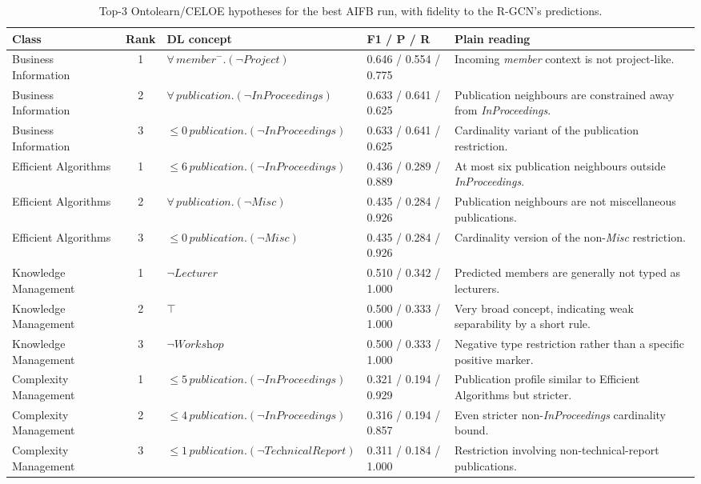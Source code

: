 \documentclass[runningheads]{llncs}
\begin{document}
\begin{table}[ht]
\centering
\scriptsize
\setlength{\tabcolsep}{3pt}
\caption{Top-3 Ontolearn/CELOE hypotheses for the best AIFB run, with fidelity to the R-GCN's predictions.}
\label{tab:explanations-full}
\begin{tabular}{@{}p{2.05cm}cp{3.05cm}p{1.55cm}p{3.4cm}@{}}
\toprule
\textbf{Class} & \textbf{Rank} & \textbf{DL concept} & \textbf{F1 / P / R} & \textbf{Plain reading} \\
\midrule
Business Information
  & 1 & $\forall\,\textit{member}^{-}.(\neg\textit{Project})$
  & 0.646 / 0.554 / 0.775
  & Incoming \textit{member} context is not project-like. \\
Business Information
  & 2 & $\forall\,\textit{publication}.(\neg\textit{InProceedings})$
  & 0.633 / 0.641 / 0.625
  & Publication neighbours are constrained away from \textit{InProceedings}. \\
Business Information
  & 3 & $\leq 0\,\textit{publication}.(\neg\textit{InProceedings})$
  & 0.633 / 0.641 / 0.625
  & Cardinality variant of the publication restriction. \\
\midrule
Efficient Algorithms
  & 1 & $\leq 6\,\textit{publication}.(\neg\textit{InProceedings})$
  & 0.436 / 0.289 / 0.889
  & At most six publication neighbours outside \textit{InProceedings}. \\
Efficient Algorithms
  & 2 & $\forall\,\textit{publication}.(\neg\textit{Misc})$
  & 0.435 / 0.284 / 0.926
  & Publication neighbours are not miscellaneous publications. \\
Efficient Algorithms
  & 3 & $\leq 0\,\textit{publication}.(\neg\textit{Misc})$
  & 0.435 / 0.284 / 0.926
  & Cardinality version of the non-\textit{Misc} restriction. \\
\midrule
Knowledge Management
  & 1 & $\neg\textit{Lecturer}$
  & 0.510 / 0.342 / 1.000
  & Predicted members are generally not typed as lecturers. \\
Knowledge Management
  & 2 & $\top$
  & 0.500 / 0.333 / 1.000
  & Very broad concept, indicating weak separability by a short rule. \\
Knowledge Management
  & 3 & $\neg\textit{Workshop}$
  & 0.500 / 0.333 / 1.000
  & Negative type restriction rather than a specific positive marker. \\
\midrule
Complexity Management
  & 1 & $\leq 5\,\textit{publication}.(\neg\textit{InProceedings})$
  & 0.321 / 0.194 / 0.929
  & Publication profile similar to Efficient Algorithms but stricter. \\
Complexity Management
  & 2 & $\leq 4\,\textit{publication}.(\neg\textit{InProceedings})$
  & 0.316 / 0.194 / 0.857
  & Even stricter non-\textit{InProceedings} cardinality bound. \\
Complexity Management
  & 3 & $\leq 1\,\textit{publication}.(\neg\textit{TechnicalReport})$
  & 0.311 / 0.184 / 1.000
  & Restriction involving non-technical-report publications. \\
\bottomrule
\end{tabular}
\end{table}
\end{document}
